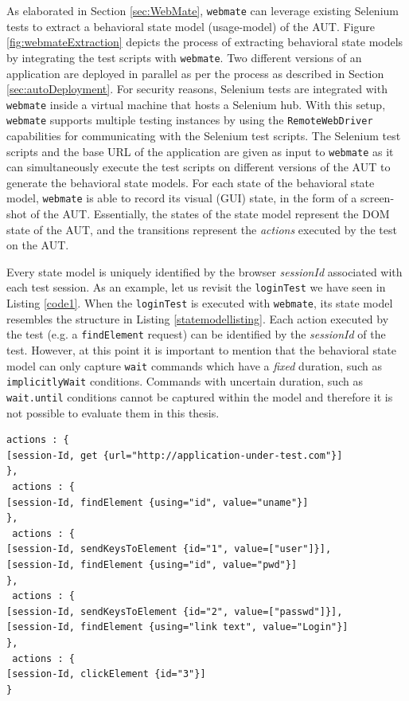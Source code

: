 As elaborated in Section \ref{sec:WebMate}, \texttt{webmate} can leverage existing Selenium tests to extract a behavioral state model (usage-model) of the AUT. Figure \ref{fig:webmateExtraction} depicts the process of extracting behavioral state models by integrating the test scripts with \texttt{webmate}. Two different versions of an application are deployed in parallel as per the process as described in Section \ref{sec:autoDeployment}. For security reasons, Selenium tests are integrated with \texttt{webmate} inside a virtual machine that hosts a Selenium hub. With this setup, \texttt{webmate} supports multiple testing instances by using the \texttt{RemoteWebDriver} capabilities for communicating with the Selenium test scripts. The Selenium test scripts and the base URL of the application are given as input to \texttt{webmate} as it can simultaneously execute the test scripts on different versions of the AUT to generate the behavioral state models. For each state of the behavioral state model, \texttt{webmate} is able to record its visual (GUI) state, in the form of a screen-shot of the AUT. Essentially, the states of the state model represent the DOM state of the AUT, and the transitions represent the \textit{actions} executed by the test on the AUT.

Every state model is uniquely identified by the browser \textit{sessionId} associated with each test session. As an example, let us revisit the \texttt{loginTest} we have seen in Listing \ref{code1}. When the \texttt{loginTest} is executed with \texttt{webmate}, its state model resembles the structure in Listing \ref{statemodellisting}. Each action executed by the test (e.g. a \texttt{findElement} request) can be identified by the \textit{sessionId} of the test. However, at this point it is important to mention that the behavioral state model can only capture \texttt{wait} commands which have a \textit{fixed} duration, such as \texttt{implicitlyWait} conditions. Commands with uncertain duration, such as \texttt{wait.until} conditions cannot be captured within the model and therefore it is not possible to evaluate them in this thesis. 

\begin{center}
\begin{scriptsize}
\centering
\lstset{
  basicstyle=\ttfamily,
  columns=fullflexible,
  keepspaces=true,
}
  
\begin{lstlisting}[caption=Extracted behavioral state model for \texttt{loginTest},label=statemodellisting]
 actions : { 
[session-Id, get {url="http://application-under-test.com"}]
},
 actions : { 
[session-Id, findElement {using="id", value="uname"}]
},
 actions : { 
[session-Id, sendKeysToElement {id="1", value=["user"]}],
[session-Id, findElement {using="id", value="pwd"}]
},
 actions : { 
[session-Id, sendKeysToElement {id="2", value=["passwd"]}],
[session-Id, findElement {using="link text", value="Login"}]
},
 actions : { 
[session-Id, clickElement {id="3"}]
}
\end{lstlisting}
\end{scriptsize} 
\end{center}

